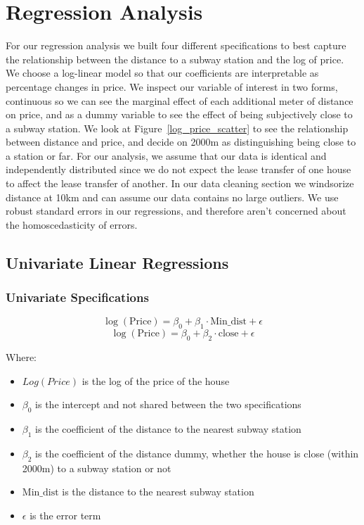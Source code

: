 \section{Regression Analysis}
\label{sec:regression_analysis}

For our regression analysis we built four different specifications to best capture the 
relationship between the distance to a subway station and the log of price. We choose a log-linear model so that our coefficients
are interpretable as percentage changes in price. We inspect our variable of interest in two forms, continuous so we can 
see the marginal effect of each additional meter of distance on price, and as a dummy variable to see the effect of being subjectively close to a subway station.
We look at Figure~\ref{log_price_scatter} to see the relationship between distance and price, and decide on 2000m as distinguishing being close to a station or far.
For our analysis, we assume that our data is identical and independently distributed since we do not expect the lease transfer of one house to affect the lease transfer of another.
In our data cleaning section we windsorize distance at 10km and can assume our data contains no large outliers.
We use robust standard errors in our regressions, and therefore aren't concerned about the homoscedasticity of errors.

\subsection{Univariate Linear Regressions}
\subsubsection{Univariate Specifications}
\begin{equation}
   \log(\text{Price}) =\beta_0 + \beta_1 \cdot \text{Min\_dist}+\epsilon
      \label{eq:univariate_linear_regression}
\end{equation}
\begin{equation}
   \log(\text{Price}) =\beta_0+\beta_2 \cdot \text{close}+\epsilon
   \label{eq:dummy_univariate_linear_regression}
\end{equation}

Where:
\begin{itemize}
   \setlength{\itemsep}{0pt}%
   \setlength{\parskip}{0pt}%
   \setlength{\parsep}{0pt}%
      \item $Log(Price)$ is the log of the price of the house
      \item $\beta_0$ is the intercept and not shared between the two specifications
      \item $\beta_1$ is the coefficient of the distance to the nearest subway station
      \item $\beta_2$ is the coefficient of the distance dummy, whether the house is close (within 2000m) to a subway station or not
      \item $\text{Min\_dist}$ is the distance to the nearest subway station
      \item $\epsilon$ is the error term
   \end{itemize}

